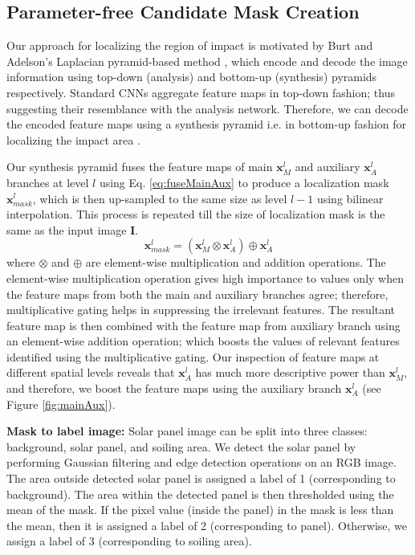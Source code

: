 \documentclass[10pt,twocolumn,letterpaper]{article}
\begin{document}
\subsection{Parameter-free Candidate Mask Creation}
Our approach for localizing the region of impact is motivated by Burt and Adelson's Laplacian pyramid-based method \cite{burt1983laplacian}, which encode and decode the image information using top-down (analysis) and bottom-up (synthesis) pyramids respectively. Standard CNNs aggregate feature maps in top-down fashion; thus suggesting their resemblance with the analysis network. Therefore, we can decode the encoded feature maps using a synthesis pyramid i.e. in bottom-up fashion for localizing the impact area \cite{ghiasi2016laplacian, noh2015learning, badrinarayanan2017segnet}.

Our synthesis pyramid fuses the feature maps of main $\mathbf{x}_{M}^l$ and auxiliary $\mathbf{x}_{A}^l$ branches at level $l$ using Eq. \ref{eq:fuseMainAux} to produce a localization mask $\mathbf{x}_{mask}^l$, which is then up-sampled to the same size as level $l-1$ using bilinear interpolation. This process is repeated till the size of localization mask is the same as the input image $\mathbf{I}$. 
\begin{equation}
\mathbf{x}_{mask}^l = (\mathbf{x}_{M}^l \otimes \mathbf{x}_{A}^l) \oplus \mathbf{x}_{A}^l
\label{eq:fuseMainAux}
 \end{equation}
 where $\otimes$ and $\oplus$ are element-wise multiplication and addition operations. The element-wise multiplication operation gives high importance to values only when the feature maps from both the main and auxiliary branches agree; therefore, multiplicative gating helps in suppressing the irrelevant features. The resultant feature map is then combined with the feature map from auxiliary branch using an element-wise addition operation; which boosts the values of relevant features identified using the multiplicative gating. Our inspection of feature maps at different spatial levels reveals that $\mathbf{x}_{A}^l$ has much more descriptive power than $\mathbf{x}_{M}^l$, and therefore, we boost the feature maps using the auxiliary branch $\mathbf{x}_{A}^l$ (see Figure \ref{fig:mainAux}).
 
\noindent \textbf{Mask to label image:} Solar panel image can be split into three classes: background, solar panel, and soiling area. We detect the solar panel by performing Gaussian filtering and edge detection operations on an RGB image. The area outside detected solar panel is assigned a label of 1 (corresponding to background). The area within the detected panel is then thresholded using the mean of the mask. If the pixel value (inside the panel) in the mask is less than the mean, then it is assigned a label of 2 (corresponding to panel). Otherwise, we assign a label of 3 (corresponding to soiling area).
\end{document}

